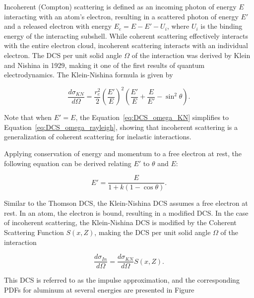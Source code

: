 \par Incoherent (Compton) scattering is defined as an incoming photon of energy $E$ interacting with an atom's electron, resulting in a scattered photon of energy $E'$ and a released electron with energy $E_e = E - E' - U_i$, where $U_i$ is the binding energy of the interacting subshell. While coherent scattering effectively interacts with the entire electron cloud, incoherent scattering interacts with an individual electron. The DCS per unit solid angle $\Omega$ of the interaction was derived by Klein and Nishina in 1929, making it one of the first results of quantum electrodynamics. The Klein-Nishina formula is given by

\begin{equation}
    \frac{d\sigma_{KN}}{d\Omega} = \frac{r_e^2}{2} \left(\frac{E'}{E}\right)^2 \left(\frac{E'}{E} + \frac{E}{E'} - \sin^2 \theta \right).
    \label{eq:DCS_omega_KN}
\end{equation}

\par Note that when $E' = E$, the Equation~\ref{eq:DCS_omega_KN} simplifies to Equation~\ref{eq:DCS_omega_rayleigh}, showing that incoherent scattering is a generalization of coherent scattering for inelastic interactions.

\par Applying conservation of energy and momentum to a free electron at rest, the following equation can be derived relating $E'$ to $\theta$ and $E$:

\begin{equation}
    E' = \frac{E}{1 + k(1 - \cos \theta)}.
\end{equation}

\par Similar to the Thomson DCS, the Klein-Nishina DCS assumes a free electron at rest. In an atom, the electron is bound, resulting in a modified DCS. In the case of incoherent scattering, the Klein-Nishina DCS is modified by the Coherent Scattering Function $S(x, Z)$, making the DCS per unit solid angle $\Omega$ of the interaction

\begin{equation}
    \frac{d\sigma_{In}}{d\Omega} = \frac{d\sigma_{KN}}{d\Omega} S(x, Z).
\end{equation}

\par This DCS is referred to as the impulse approximation, and the corresponding PDFs for aluminum at several energies are presented in Figure

